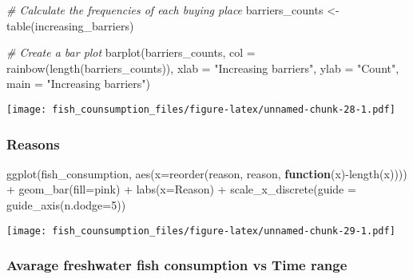 \documentclass[
]{article}
\newenvironment{Shaded}{\begin{snugshade}}{\end{snugshade}}
\newcommand{\AttributeTok}[1]{\textcolor[rgb]{0.77,0.63,0.00}{#1}}
\newcommand{\CommentTok}[1]{\textcolor[rgb]{0.56,0.35,0.01}{\textit{#1}}}
\newcommand{\ControlFlowTok}[1]{\textcolor[rgb]{0.13,0.29,0.53}{\textbf{#1}}}
\newcommand{\DecValTok}[1]{\textcolor[rgb]{0.00,0.00,0.81}{#1}}
\newcommand{\FunctionTok}[1]{\textcolor[rgb]{0.00,0.00,0.00}{#1}}
\newcommand{\NormalTok}[1]{#1}
\newcommand{\OtherTok}[1]{\textcolor[rgb]{0.56,0.35,0.01}{#1}}
\newcommand{\SpecialCharTok}[1]{\textcolor[rgb]{0.00,0.00,0.00}{#1}}
\newcommand{\StringTok}[1]{\textcolor[rgb]{0.31,0.60,0.02}{#1}}
\begin{document}
\begin{Shaded}
\begin{Highlighting}[]
\CommentTok{\# Calculate the frequencies of each buying place}
\NormalTok{barriers\_counts }\OtherTok{\textless{}{-}} \FunctionTok{table}\NormalTok{(increasing\_barriers)}

\CommentTok{\# Create a bar plot}
\FunctionTok{barplot}\NormalTok{(barriers\_counts, }\AttributeTok{col =} \FunctionTok{rainbow}\NormalTok{(}\FunctionTok{length}\NormalTok{(barriers\_counts)), }
        \AttributeTok{xlab =} \StringTok{"Increasing barriers"}\NormalTok{, }\AttributeTok{ylab =} \StringTok{"Count"}\NormalTok{, }\AttributeTok{main =} \StringTok{"Increasing barriers"}\NormalTok{)}
\end{Highlighting}
\end{Shaded}

\texttt{[image: fish\_counsumption\_files/figure-latex/unnamed-chunk-28-1.pdf]}

\hypertarget{reasons}{%
\subsubsection{Reasons}\label{reasons}}

\begin{Shaded}
\begin{Highlighting}[]
\FunctionTok{ggplot}\NormalTok{(fish\_consumption, }\FunctionTok{aes}\NormalTok{(}\AttributeTok{x=}\FunctionTok{reorder}\NormalTok{(reason, reason, }\ControlFlowTok{function}\NormalTok{(x)}\SpecialCharTok{{-}}\FunctionTok{length}\NormalTok{(x)))) }\SpecialCharTok{+}
  \FunctionTok{geom\_bar}\NormalTok{(}\AttributeTok{fill=}\StringTok{\textquotesingle{}pink\textquotesingle{}}\NormalTok{) }\SpecialCharTok{+} 
  \FunctionTok{labs}\NormalTok{(}\AttributeTok{x=}\StringTok{\textquotesingle{}Reason\textquotesingle{}}\NormalTok{) }\SpecialCharTok{+}
  \FunctionTok{scale\_x\_discrete}\NormalTok{(}\AttributeTok{guide =} \FunctionTok{guide\_axis}\NormalTok{(}\AttributeTok{n.dodge=}\DecValTok{5}\NormalTok{))}
\end{Highlighting}
\end{Shaded}

\texttt{[image: fish\_counsumption\_files/figure-latex/unnamed-chunk-29-1.pdf]}

\hypertarget{avarage-freshwater-fish-consumption-vs-time-range}{%
\subsubsection{Avarage freshwater fish consumption vs Time
range}\label{avarage-freshwater-fish-consumption-vs-time-range}}
\end{document}
